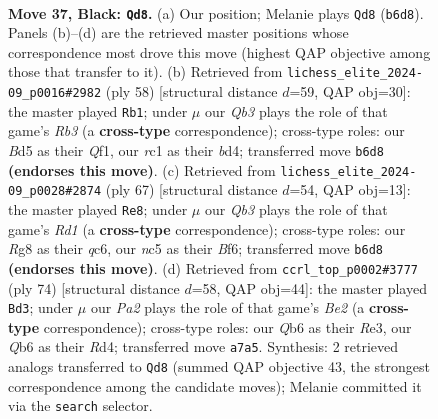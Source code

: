\documentclass[11pt]{article}
\begin{document}
\clearpage

\begin{figure}[p]\centering
\begin{subfigure}{0.46\textwidth}\centering
\resizebox{\linewidth}{!}{%
\newchessgame
\chessboard[
  setfen={rk4r1/p4p1p/1qp5/2Nb1Q2/3P4/6PP/5P2/2R3K1 b - - 6 37},
  showmover=false,
  pgfstyle=straightmove, color=movearrow, markmove={b6-d8}
]}
\caption{}
\end{subfigure}\hfill
\begin{subfigure}{0.46\textwidth}\centering
\resizebox{\linewidth}{!}{%
\newchessgame
\chessboard[
  setfen={7k/1pr4p/4p2q/pB3p2/Pn1b3P/1R4PR/7K/5Q2 w - - 0 30},
  showmover=false,
  pgfstyle=straightmove, color=movearrow, markmove={b3-b1}
]}
\caption{}
\end{subfigure}
\\[4pt]
\begin{subfigure}{0.46\textwidth}\centering
\resizebox{\linewidth}{!}{%
\newchessgame
\chessboard[
  setfen={3r2kr/5qp1/2Q1pb1p/5p2/1p3N2/7P/1P4P1/5R1K b - - 5 34},
  showmover=false,
  pgfstyle=straightmove, color=movearrow, markmove={d8-e8}
]}
\caption{}
\end{subfigure}\hfill
\begin{subfigure}{0.46\textwidth}\centering
\resizebox{\linewidth}{!}{%
\newchessgame
\chessboard[
  setfen={4r1k1/1bq2pp1/p6p/P7/1QPRn3/K3R3/4B2P/8 w - - 0 38},
  showmover=false,
  pgfstyle=straightmove, color=movearrow, markmove={e2-d3}
]}
\caption{}
\end{subfigure}
\caption{\textbf{Move 37, Black: \texttt{Qd8}.} (a) Our position; Melanie plays \texttt{Qd8} (\texttt{b6d8}). Panels (b)--(d) are the retrieved master positions whose correspondence most drove this move (highest QAP objective among those that transfer to it). (b) Retrieved from \texttt{lichess\_elite\_2024-09\_p0016\#2982} (ply 58) [structural distance $d$=59, QAP obj=30]: the master played \texttt{Rb1}; under $\mu$ our \emph{Qb3} plays the role of that game's \emph{Rb3} (a \textbf{cross-type} correspondence); cross-type roles: our \emph{B}d5 as their \emph{Q}f1, our \emph{r}c1 as their \emph{b}d4; transferred move \texttt{b6d8} \textbf{(endorses this move)}. (c) Retrieved from \texttt{lichess\_elite\_2024-09\_p0028\#2874} (ply 67) [structural distance $d$=54, QAP obj=13]: the master played \texttt{Re8}; under $\mu$ our \emph{Qb3} plays the role of that game's \emph{Rd1} (a \textbf{cross-type} correspondence); cross-type roles: our \emph{R}g8 as their \emph{q}c6, our \emph{n}c5 as their \emph{B}f6; transferred move \texttt{b6d8} \textbf{(endorses this move)}. (d) Retrieved from \texttt{ccrl\_top\_p0002\#3777} (ply 74) [structural distance $d$=58, QAP obj=44]: the master played \texttt{Bd3}; under $\mu$ our \emph{Pa2} plays the role of that game's \emph{Be2} (a \textbf{cross-type} correspondence); cross-type roles: our \emph{Q}b6 as their \emph{R}e3, our \emph{Q}b6 as their \emph{R}d4; transferred move \texttt{a7a5}. Synthesis: 2 retrieved analogs transferred to \texttt{Qd8} (summed QAP objective 43, the strongest correspondence among the candidate moves); Melanie committed it via the \texttt{search} selector.}
\label{fig:thought-m73}
\end{figure}
\end{document}
